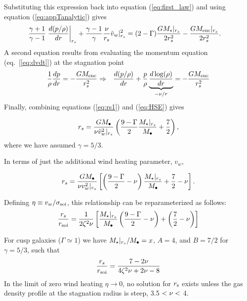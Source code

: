 Substituting this expression back into equation (\ref{eq:first_law}) and using equation (\ref{eq:appTanalytic}) gives
\begin{align}
&\frac{\gamma+1}{\gamma-1}
\left.\frac{d (p/\rho)}{d r}\right|_{r_s}+ \frac{\gamma-1}{\gamma} \frac{\nu}{r_s} \tilde{v}_{w}|_{r_s}^{2} = (2-\Gamma) \frac{G
  M_{\star}|_{r_s}}{2 r_s^2} -\frac{G M_{\rm enc}|_{r_s}}{2 r_s^2}.  \label{eq:rs1}
\end{align}
A second equation results from evaluating the momentum equation (eq.~[\ref{eq:dvdt}]) at the stagnation point
\begin{align}
&\frac{1}{\rho}\frac{d p}{d r}=- \frac{GM_{\rm enc}}{r_s^2} \Rightarrow
&\frac{d (p/\rho)}{d r}+\frac{p}{\rho}
\underbrace{\frac{d\log(\rho)}{dr}}_{-\nu/r} = -\frac{G M_{\rm enc}}{r_s^2} \label{eq:HSE}
\end{align}
Finally, combining equations (\ref{eq:rs1}) and (\ref{eq:HSE}) gives 

\begin{align}
r_s=\frac{G M_{\bullet}}{\nu \tilde{v}_{w}^{2}|_{r_s}}\left(\frac{9-\Gamma}{2}
  \frac{M_{\star}|_{r_s}}{M_{\bullet}} +\frac{7}{2}\right),
\end{align}
where we have assumed $\gamma=5/3$.

In terms of just the additional wind heating parameter, $v_w$,

\begin{align}
r_s=\frac{G M_{\bullet}}{\nu v_w^{2}|_{r_s}}\left[\left(\frac{9-\Gamma}{2} -\nu\right) \frac{M_{\star}|_{r_s}}{M_{\bullet}} +\frac{7}{2}-\nu\right].
\label{eq:rs2main}
\end{align}


Defining $\eta \equiv v_{w}/\sigma_{\rm soi}$, this relationship can be
reparameterized as follows:
\begin{align}
  \frac{r_s}{r_{\rm soi}}=\frac{1}{2 \zeta^2 \nu}\left[
    \frac{M_{\star}|_{r_s}}{M_{\bullet}}\left(\frac{9-\Gamma}{2}-\nu\right)+\left(\frac{7}{2}-\nu\right)\right]
  \label{eq:rsRinf}
\end{align}

For cusp galaxies ($\Gamma\simeq1$) we have $M_{\star}|_{r_s}/M_{\bullet}=x$, $A=4$, and $B=7/2$ for $\gamma = 5/3$, such that 
\begin{align}
\frac{r_s}{r_{\rm soi}}=\frac{7-2\nu}{4\zeta^2 \nu+2\nu-8}
\end{align}
In the limit of zero wind heating $\eta \rightarrow 0$, no solution
for $r_{\rm s}$ exists unless the gas density profile at the
stagnation radius is steep, 3.5 $<\nu<$ 4.

